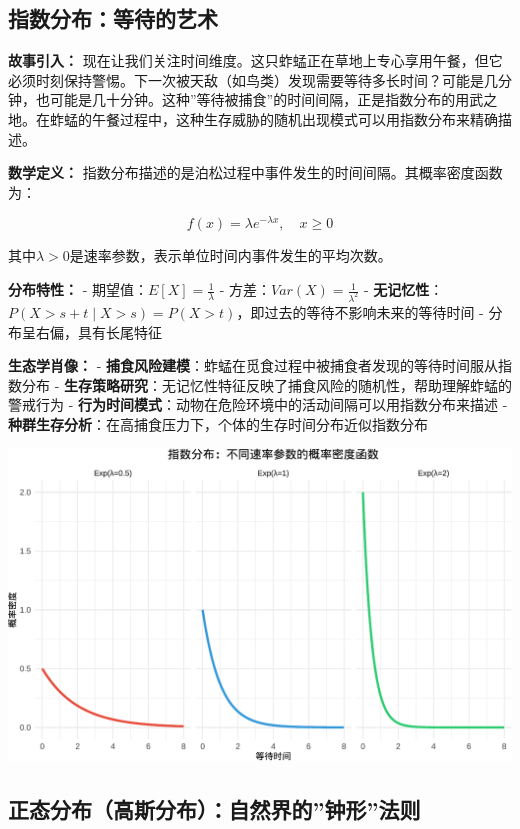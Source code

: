 \documentclass[
]{book}
\begin{document}
\hypertarget{ux6307ux6570ux5206ux5e03ux7b49ux5f85ux7684ux827aux672f}{%
\subsection{指数分布：等待的艺术}\label{ux6307ux6570ux5206ux5e03ux7b49ux5f85ux7684ux827aux672f}}

\textbf{故事引入：} 现在让我们关注时间维度。这只蚱蜢正在草地上专心享用午餐，但它必须时刻保持警惕。下一次被天敌（如鸟类）发现需要等待多长时间？可能是几分钟，也可能是几十分钟。这种''等待被捕食''的时间间隔，正是指数分布的用武之地。在蚱蜢的午餐过程中，这种生存威胁的随机出现模式可以用指数分布来精确描述。

\textbf{数学定义：} 指数分布描述的是泊松过程中事件发生的时间间隔。其概率密度函数为：

\[f(x) = \lambda e^{-\lambda x}, \quad x \geq 0\]

其中\(\lambda > 0\)是速率参数，表示单位时间内事件发生的平均次数。

\textbf{分布特性：}
- 期望值：\(E[X] = \frac{1}{\lambda}\)
- 方差：\(Var(X) = \frac{1}{\lambda^2}\)
- \textbf{无记忆性}：\(P(X > s + t \mid X > s) = P(X > t)\)，即过去的等待不影响未来的等待时间
- 分布呈右偏，具有长尾特征

\textbf{生态学肖像：}
- \textbf{捕食风险建模}：蚱蜢在觅食过程中被捕食者发现的等待时间服从指数分布
- \textbf{生存策略研究}：无记忆性特征反映了捕食风险的随机性，帮助理解蚱蜢的警戒行为
- \textbf{行为时间模式}：动物在危险环境中的活动间隔可以用指数分布来描述
- \textbf{种群生存分析}：在高捕食压力下，个体的生存时间分布近似指数分布

\begin{center}\includegraphics[width=0.8\linewidth]{ecological-statistics_files/figure-latex/unnamed-chunk-28-1} \end{center}

\hypertarget{ux6b63ux6001ux5206ux5e03ux9ad8ux65afux5206ux5e03ux81eaux7136ux754cux7684ux949fux5f62ux6cd5ux5219}{%
\subsection{正态分布（高斯分布）：自然界的''钟形''法则}\label{ux6b63ux6001ux5206ux5e03ux9ad8ux65afux5206ux5e03ux81eaux7136ux754cux7684ux949fux5f62ux6cd5ux5219}}
\end{document}
